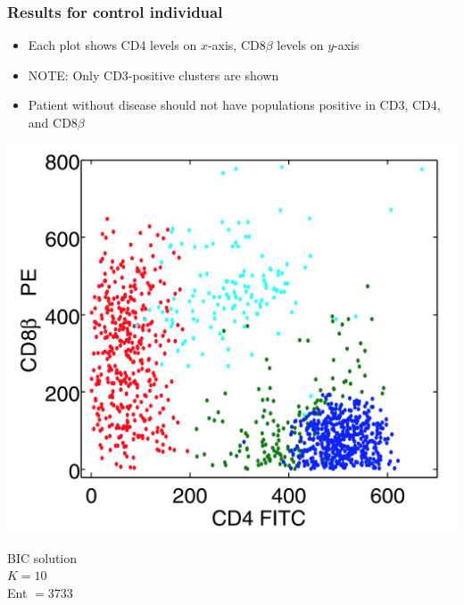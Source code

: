 \documentclass[mathserif,compress]{beamer}
\renewcommand\;{\,}
\begin{document}
\begin{frame}\frametitle{Results for control individual}
\begin{itemize}
\item[]
Each plot shows CD4 levels on $x$-axis, CD8$\beta$ levels on $y$-axis
\medskip
\item[]
\alert{NOTE}: Only CD3-positive clusters are shown
\end{itemize}
\begin{center}
\begin{minipage}{0.3\linewidth}
\begin{itemize}
\item[]
Patient without disease should not have populations positive in CD3, CD4, and CD8$\beta$
\end{itemize}
\end{minipage}
\hfill
\begin{minipage}{0.3\linewidth}
\includegraphics[width=\linewidth]{BIC_control.png}
\begin{center}
BIC solution
\\
$K = 10$
\\
Ent $ = 3733$
\end{center}
\end{minipage}
\hfill
\begin{minipage}{0.3\linewidth}

\end{minipage}
\end{center}
\end{frame}
\end{document}
